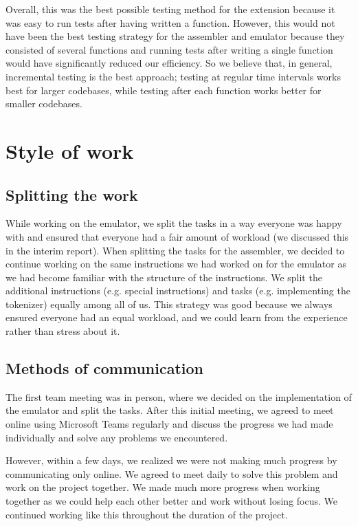 \documentclass[11pt]{article}
\begin{document}
Overall, this was the best possible testing method for the extension because it was easy to run tests after having written a function. However, this would not have been the best testing strategy for the assembler and emulator because they consisted of several functions and running tests after writing a single function would have significantly reduced our efficiency. So we believe that, in general, incremental testing is the best approach; testing at regular time intervals works best for larger codebases, while testing after each function works better for smaller codebases.

\section{Style of work}
\subsection{Splitting the work}
While working on the emulator, we split the tasks in a way everyone was happy with and ensured that everyone had a fair amount of workload (we discussed this in the interim report). When splitting the tasks for the assembler, we decided to continue working on the same instructions we had worked on for the emulator as we had become familiar with the structure of the instructions. We split the additional instructions (e.g. special instructions) and tasks (e.g. implementing the tokenizer) equally among all of us. This strategy was good because we always ensured everyone had an equal workload, and we could learn from the experience rather than stress about it. 

\subsection{Methods of communication}
The first team meeting was in person, where we decided on the implementation of the emulator and split the tasks. After this initial meeting, we agreed to meet online using Microsoft Teams regularly and discuss the progress we had made individually and solve any problems we encountered. 

However, within a few days, we realized we were not making much progress by communicating only online. We agreed to meet daily to solve this problem and work on the project together. We made much more progress when working together as we could help each other better and work without losing focus. We continued working like this throughout the duration of the project. 
\end{document}
